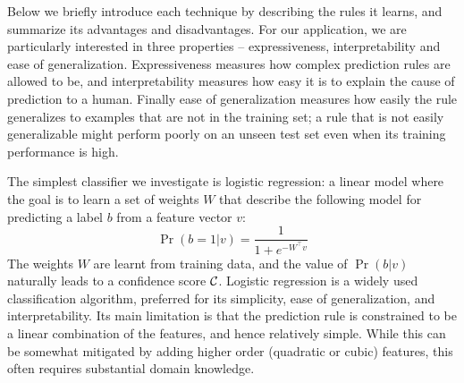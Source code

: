 Below we briefly introduce each technique by describing the rules it
learns, and summarize its advantages and disadvantages.
%
For our application, we are particularly interested in three properties
-- expressiveness, interpretability and ease of generalization.
%
Expressiveness measures how complex prediction rules are allowed to be,
and interpretability measures how easy it is to explain the cause of
prediction to a human.
%
Finally ease of generalization measures how easily the rule generalizes
to examples that are not in the training set; a rule that is not
easily generalizable might perform poorly on an unseen test set even
when its training performance is high.



The simplest classifier we investigate is logistic regression:
a linear model where the goal is to learn a set of weights $W$
that describe the following model for predicting a label
$b$ from a feature vector $v$:
%
\[ \Pr(b = 1 | v) = \frac{1}{1 + e^{-W^{\top} v}} \]
%
The weights $W$ are learnt from training data, and the value of
$\Pr(b | v)$ naturally leads to a confidence score $\mathcal{C}$.
%
Logistic regression is a widely used classification algorithm, preferred
for its simplicity, ease of generalization, and interpretability.
%
Its main limitation is that the prediction rule is constrained to be a
linear combination of the features, and hence relatively simple.
%
While this can be somewhat mitigated by adding higher order (quadratic
or cubic) features, this often requires substantial domain knowledge.


